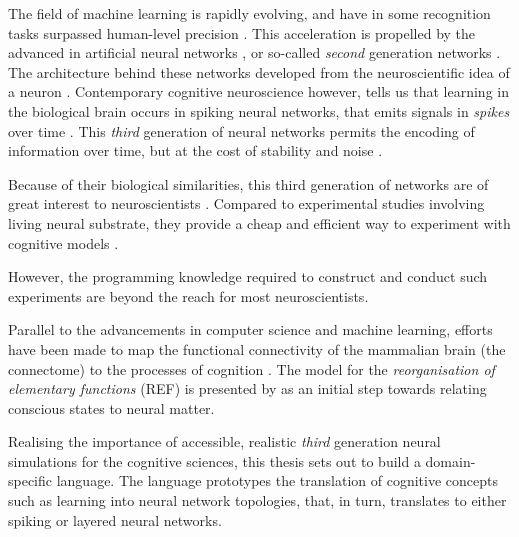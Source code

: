 \documentclass[report.tex]{subfiles}
\begin{document}
The field of machine learning is rapidly evolving, and have in
some recognition tasks surpassed human-level precision
\autocite{Schmidhuber2014}.
This acceleration is propelled by the advanced in artificial neural
networks \autocite{Rumelhart1988, Schmidhuber2014, Nilsson2009}, or
so-called \textit{second} generation networks \cite{Maass1997}.
The architecture behind these networks developed from the neuroscientific
idea of a neuron \autocite{Nilsson2009, Russel2007}.
Contemporary cognitive neuroscience however, tells us that learning in
the biological brain occurs in spiking neural networks, that emits
signals in \textit{spikes} over time \cite{Dayan2001, Eliasmith2004}.
This \textit{third} generation of neural networks permits the encoding
of information over time, but at the cost of stability and 
noise \autocite{Maass1997}.

Because of their biological similarities, this third generation of
networks are of great interest to neuroscientists
\autocite{Dayan2001,Bruderle2011,Eliasmith2015}.
Compared to experimental studies involving living neural substrate,
they provide a cheap and efficient way to experiment with cognitive 
models \autocite{Eliasmith2015}.

However, the programming knowledge required to construct and conduct
such experiments are beyond the reach for most neuroscientists.

Parallel to the advancements in computer science and machine learning,
efforts have been made to map the functional connectivity of the mammalian
brain (the connectome) to the processes of cognition \autocite{Mogensen2018}.
The model for the \textit{reorganisation of elementary functions} (REF)
is presented by \textcite{Mogensen2017} as an initial step towards
relating conscious states to neural matter.


\vskip10pt
Realising the importance of accessible, realistic \textit{third} 
generation neural simulations for the cognitive sciences, this thesis
sets out to build a domain-specific language.
The language prototypes the translation of cognitive concepts 
such as learning into neural network topologies, that, in turn,
translates to either spiking or layered neural networks.
\end{document}
